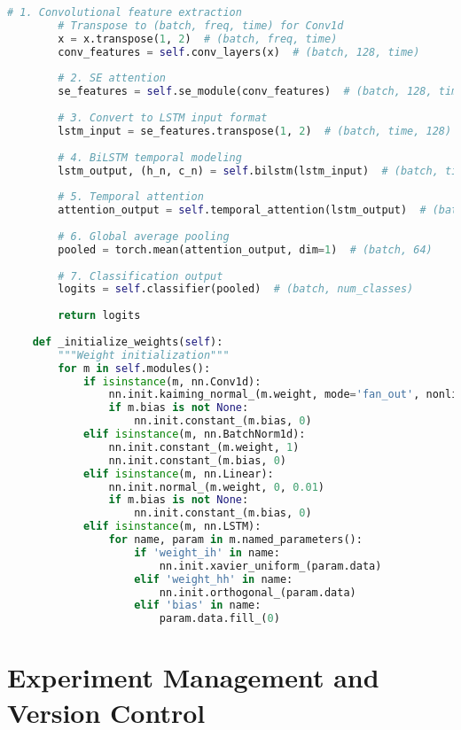 \begin{lstlisting}[language=Python,caption=Complete Implementation of Enhanced Model]
        # 1. Convolutional feature extraction
        # Transpose to (batch, freq, time) for Conv1d
        x = x.transpose(1, 2)  # (batch, freq, time)
        conv_features = self.conv_layers(x)  # (batch, 128, time)
        
        # 2. SE attention
        se_features = self.se_module(conv_features)  # (batch, 128, time)
        
        # 3. Convert to LSTM input format
        lstm_input = se_features.transpose(1, 2)  # (batch, time, 128)
        
        # 4. BiLSTM temporal modeling
        lstm_output, (h_n, c_n) = self.bilstm(lstm_input)  # (batch, time, hidden_dim)
        
        # 5. Temporal attention
        attention_output = self.temporal_attention(lstm_output)  # (batch, time, 64)
        
        # 6. Global average pooling
        pooled = torch.mean(attention_output, dim=1)  # (batch, 64)
        
        # 7. Classification output
        logits = self.classifier(pooled)  # (batch, num_classes)
        
        return logits
    
    def _initialize_weights(self):
        """Weight initialization"""
        for m in self.modules():
            if isinstance(m, nn.Conv1d):
                nn.init.kaiming_normal_(m.weight, mode='fan_out', nonlinearity='relu')
                if m.bias is not None:
                    nn.init.constant_(m.bias, 0)
            elif isinstance(m, nn.BatchNorm1d):
                nn.init.constant_(m.weight, 1)
                nn.init.constant_(m.bias, 0)
            elif isinstance(m, nn.Linear):
                nn.init.normal_(m.weight, 0, 0.01)
                if m.bias is not None:
                    nn.init.constant_(m.bias, 0)
            elif isinstance(m, nn.LSTM):
                for name, param in m.named_parameters():
                    if 'weight_ih' in name:
                        nn.init.xavier_uniform_(param.data)
                    elif 'weight_hh' in name:
                        nn.init.orthogonal_(param.data)
                    elif 'bias' in name:
                        param.data.fill_(0)
\end{lstlisting}

\section{Experiment Management and Version Control}
\label{sec:experiment_management}

